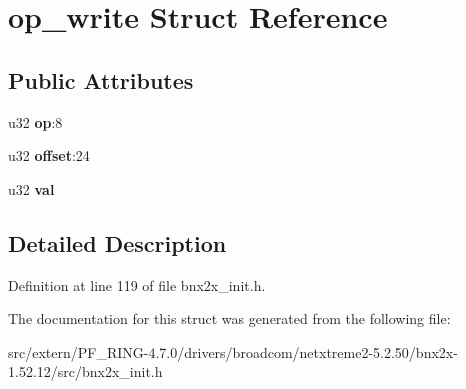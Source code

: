 \hypertarget{structop__write}{
\section{op\_\-write Struct Reference}
\label{structop__write}
}
\subsection*{Public Attributes}
\begin{DoxyCompactItemize}
\item 
\hypertarget{structop__write_a3f90dae1d490915e4587fd329991ebcf}{
u32 {\bfseries op}:8}
\label{structop__write_a3f90dae1d490915e4587fd329991ebcf}

\item 
\hypertarget{structop__write_a10cb83944eb931d29c1b0e39c4b22864}{
u32 {\bfseries offset}:24}
\label{structop__write_a10cb83944eb931d29c1b0e39c4b22864}

\item 
\hypertarget{structop__write_adbbb253318bfe44c9374dcb9580a4713}{
u32 {\bfseries val}}
\label{structop__write_adbbb253318bfe44c9374dcb9580a4713}

\end{DoxyCompactItemize}


\subsection{Detailed Description}


Definition at line 119 of file bnx2x\_\-init.h.



The documentation for this struct was generated from the following file:\begin{DoxyCompactItemize}
\item 
src/extern/PF\_\-RING-\/4.7.0/drivers/broadcom/netxtreme2-\/5.2.50/bnx2x-\/1.52.12/src/bnx2x\_\-init.h\end{DoxyCompactItemize}
